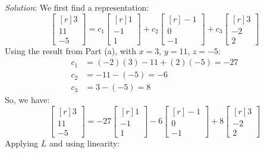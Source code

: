 \documentclass[12pt]{article}
\begin{document}
\emph{Solution}:
We first find a representation:
\[
\begin{bmatrix*}[r]3\\11\\-5\end{bmatrix*}=
c_1\begin{bmatrix*}[r] 1\\ -1\\ 1\end{bmatrix*}+
c_2\begin{bmatrix*}[r] -1\\ 0\\-1\end{bmatrix*}+
c_3\begin{bmatrix*}[r] 3\\ -2\\ 2\end{bmatrix*}
\]
Using the result from Part (a), with $x=3$, $y=11$, $z=-5$:
\begin{align*}
c_1&=(-2)(3)-11+(2)(-5)=-27\\
c_2&=-11-(-5)=-6\\
c_3&=3-(-5)=8
\end{align*}
So, we have:
\[
\begin{bmatrix*}[r]3\\11\\-5\end{bmatrix*}=
-27\begin{bmatrix*}[r] 1\\ -1\\ 1\end{bmatrix*}
-6\begin{bmatrix*}[r] -1\\ 0\\-1\end{bmatrix*}+
8\begin{bmatrix*}[r] 3\\ -2\\ 2\end{bmatrix*}
\]
Applying $L$ and using linearity:
\end{document}

